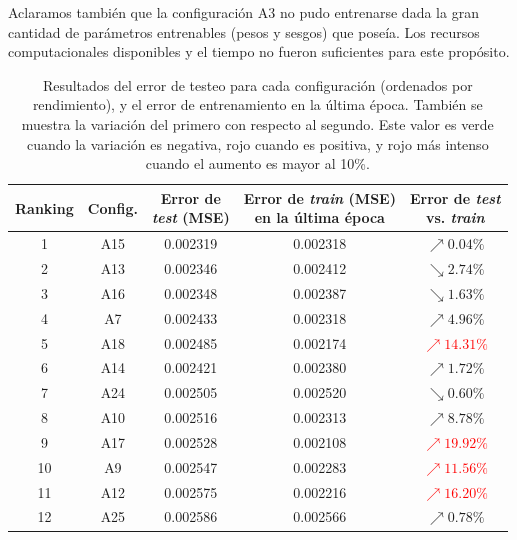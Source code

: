 Aclaramos también que la configuración A3 no pudo entrenarse dada la gran cantidad de parámetros entrenables (pesos y sesgos) que poseía. Los recursos computacionales disponibles y el tiempo no fueron suficientes para este propósito.


\begin{table}[htbp]
\centering
\caption{Resultados del error de testeo para cada configuración (ordenados por rendimiento), y el error de entrenamiento en la última época. También se muestra la variación del primero con respecto al segundo. Este valor es verde cuando la variación es negativa, rojo cuando es positiva, y rojo más intenso cuando el aumento es mayor al 10\%.}
\label{tab:testing_results}
\small
\begin{tabular}{|c|c|c|c|c|}
\hline
\textbf{Ranking} &
\textbf{Config.} &
\makecell{\textbf{Error de} \\ \textbf{\emph{test} (MSE)}} &
\makecell{\textbf{Error de \emph{train} (MSE)} \\ \textbf{en la última época}} &
\makecell{\textbf{Error de \emph{test}} \\ \textbf{vs. \emph{train}}} \\
\hline
1 & A15 & 0.002319 & 0.002318 & \textcolor{rojito}{$\nearrow 0.04\%$} \\
2 & A13 & 0.002346 & 0.002412 & \textcolor{verdecito}{$\searrow 2.74\%$} \\
3 & A16 & 0.002348 & 0.002387 & \textcolor{verdecito}{$\searrow 1.63\%$} \\
4 & A7 & 0.002433 & 0.002318 & \textcolor{rojito}{$\nearrow 4.96\%$} \\
5 & A18 & 0.002485 & 0.002174 & \textcolor{red}{$\nearrow 14.31\%$} \\
6 & A14 & 0.002421 & 0.002380 & \textcolor{rojito}{$\nearrow 1.72\%$} \\
7 & A24 & 0.002505 & 0.002520 & \textcolor{verdecito}{$\searrow 0.60\%$} \\
8 & A10 & 0.002516 & 0.002313 & \textcolor{rojito}{$\nearrow 8.78\%$} \\
9 & A17 & 0.002528 & 0.002108 & \textcolor{red}{$\nearrow 19.92\%$} \\
10 & A9 & 0.002547 & 0.002283 & \textcolor{red}{$\nearrow 11.56\%$} \\
11 & A12 & 0.002575 & 0.002216 & \textcolor{red}{$\nearrow 16.20\%$} \\
12 & A25 & 0.002586 & 0.002566 & \textcolor{rojito}{$\nearrow 0.78\%$} \\

\end{tabular}
\end{table}
